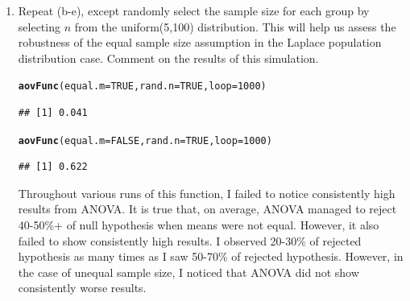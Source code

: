 \documentclass{article}\usepackage[]{graphicx}\usepackage[]{color}
\makeatletter
\newcommand{\hlnum}[1]{\textcolor[rgb]{0.686,0.059,0.569}{#1}}%
\newcommand{\hlstd}[1]{\textcolor[rgb]{0.345,0.345,0.345}{#1}}%
\newcommand{\hlkwc}[1]{\textcolor[rgb]{0.333,0.667,0.333}{#1}}%
\newcommand{\hlkwd}[1]{\textcolor[rgb]{0.737,0.353,0.396}{\textbf{#1}}}%
\newenvironment{kframe}{%
 \def\at@end@of@kframe{}%
 \ifinner\ifhmode%
  \def\at@end@of@kframe{\end{minipage}}%
  \begin{minipage}{\columnwidth}%
 \fi\fi%
 \def\FrameCommand##1{\hskip\@totalleftmargin \hskip-\fboxsep
 \colorbox{shadecolor}{##1}\hskip-\fboxsep
     \hskip-\linewidth \hskip-\@totalleftmargin \hskip\columnwidth}%
 \MakeFramed {\advance\hsize-\width
   \@totalleftmargin\z@ \linewidth\hsize
   \@setminipage}}%
 {\par\unskip\endMakeFramed%
 \at@end@of@kframe}
\newenvironment{knitrout}{}{} %
\makeatother
\begin{document}
\begin{enumerate}
\begin{enumerate}
\item Repeat (b-e), except randomly select the sample size for each 
group by selecting $n$ from the uniform(5,100) distribution. This 
will help us assess the robustness of the equal sample size assumption
in the Laplace population distribution case. Comment on the results of 
this simulation.
\begin{knitrout}
\color{fgcolor}\begin{kframe}
\begin{alltt}
\hlkwd{aovFunc}\hlstd{(}\hlkwc{equal.m}\hlstd{=}\hlnum{TRUE}\hlstd{,} \hlkwc{rand.n}\hlstd{=}\hlnum{TRUE}\hlstd{,} \hlkwc{loop}\hlstd{=}\hlnum{1000}\hlstd{)}
\end{alltt}
\begin{verbatim}
## [1] 0.041
\end{verbatim}
\begin{alltt}
\hlkwd{aovFunc}\hlstd{(}\hlkwc{equal.m}\hlstd{=}\hlnum{FALSE}\hlstd{,} \hlkwc{rand.n}\hlstd{=}\hlnum{TRUE}\hlstd{,} \hlkwc{loop}\hlstd{=}\hlnum{1000}\hlstd{)}
\end{alltt}
\begin{verbatim}
## [1] 0.622
\end{verbatim}
\end{kframe}
\end{knitrout}
Throughout various runs of this function, I failed to notice consistently high results from ANOVA. It is true that, on average, ANOVA managed to reject 40-50\%+ of null hypothesis when means were not equal. However, it also failed to show consistently high results. I observed 20-30\% of rejected hypothesis as many times as I saw 50-70\% of rejected hypothesis. However, in the case of unequal sample size, I noticed that ANOVA did not show consistently worse results.


\end{enumerate}
\end{enumerate}
\end{document}

